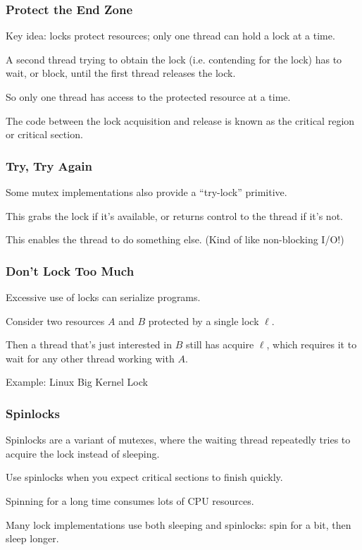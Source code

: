 \begin{frame}
\frametitle{Protect the End Zone}

Key idea: locks protect resources; only one thread
can hold a lock at a time. 

A second thread trying to obtain the lock
(i.e. \alert{contending} for the lock) has to wait, or \alert{block},
until the first thread releases the lock. 

So only one thread has
access to the protected resource at a time. 

The code between the lock
acquisition and release is known as the \alert{critical region} or \alert{critical section}.

\end{frame}


\begin{frame}
\frametitle{Try, Try Again}

Some mutex implementations also provide a ``try-lock'' primitive.

This grabs the lock if it's available, or returns control to the
thread if it's not.

This enables the thread to do something else. (Kind of
like non-blocking I/O!)

\end{frame}



\begin{frame}
\frametitle{Don't Lock Too Much}

Excessive use of locks can serialize programs. 

Consider two resources
$A$ and $B$ protected by a single lock $\ell$. 

Then a thread that's
just interested in $B$ still has acquire $\ell$, which requires it to
wait for any other thread working with $A$.

Example: Linux Big Kernel Lock

\end{frame}



\begin{frame}
\frametitle{Spinlocks}

Spinlocks are a variant of mutexes, where the
waiting thread repeatedly tries to acquire the lock instead of sleeping.

Use spinlocks when you expect critical sections to finish 
quickly.

Spinning
for a long time consumes lots of CPU resources.

 Many lock
implementations use both sleeping and spinlocks: spin for a bit,
then sleep longer.


\end{frame}




